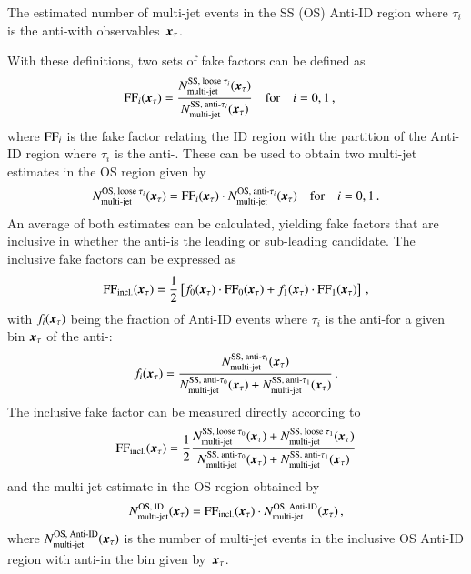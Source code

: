 {\begin{description}[style=standard]
  \item[$\NmjAntiID{SS(OS)}{i}\ffargs$] The estimated number of
    multi-jet events in the SS (OS) Anti-ID region where $\tau_i$ is
    the anti-\tauhadvis with observables~$\myvec{x}_\tau$.
  \end{description}
  With these definitions, two sets of fake factors can be defined as
  \begin{align*}
    \FF_{i}\ffargs &= \frac{\NmjID{SS}{i} \ffargs}{\NmjAntiID{SS}{i}\ffargs}
                     \quad \text{for} \quad i = 0, 1 \,\text{,}
  \end{align*}
  where $\text{FF}_{i}$ is the fake factor relating the ID region with the
  partition of the Anti-ID region where $\tau_i$ is the
  anti-\tauhadvis. These can be used to obtain two multi-jet estimates
  in the OS region given by
  \begin{align*}
    \NmjID{OS}{i}\ffargs = \FF_{i}\ffargs \cdot \NmjAntiID{OS}{i}\ffargs
    \quad \text{for} \quad i = 0, 1 \,\text{.}
  \end{align*}
  An average of both estimates can be calculated, yielding fake
  factors that are inclusive in whether the anti-\tauhadvis is the
  leading or sub-leading \tauhadvis candidate. The inclusive fake
  factors can be expressed as
  \begin{align*}
    \FF_\text{incl.}\ffargs = \frac{1}{2} \left[ f_0\ffargs \cdot \FF_0\ffargs
    + f_1\ffargs \cdot \FF_1\ffargs \right] \,\text{,}
  \end{align*}
  with $f_i\ffargs$ being the fraction of Anti-ID events where
  $\tau_i$ is the anti-\tauhadvis for a given bin $\myvec{x}_\tau$ of
  the anti-\tauhadvis:
  \begin{align*}
    f_i\ffargs = \frac{\NmjAntiID{SS}{i}\ffargs}
                      {\NmjAntiID{SS}{0}\ffargs + \NmjAntiID{SS}{1}\ffargs} \,\text{.}
  \end{align*}
  The inclusive fake factor can be measured directly according to
  \begin{align}
    \FF_\text{incl.}\ffargs
    = \frac{1}{2} \frac{ \NmjID{SS}{0}\ffargs + \NmjID{SS}{1}\ffargs }
                       { \NmjAntiID{SS}{0}\ffargs + \NmjAntiID{SS}{1}\ffargs }
    \label{eq:inclusive_fake_factor}
  \end{align}
  and the multi-jet estimate in the OS region obtained by
  \begin{align*}
    \NmjIDIncl{OS}\ffargs = \FF_\text{incl.}\ffargs \cdot \NmjAntiIDIncl{OS}\ffargs \,\text{,}
  \end{align*}
  where $\NmjAntiIDIncl{OS}\ffargs$ is the number of multi-jet events
  in the inclusive OS Anti-ID region with anti-\tauhadvis in the bin
  given by~$\myvec{x}_\tau$.

}
